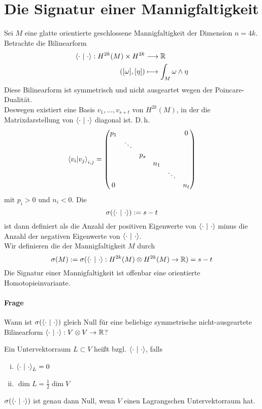 \section{Die Signatur einer Mannigfaltigkeit}
Sei $M$ eine glatte orientierte geschlossene Mannigfaltigkeit der Dimension $n = 4k$.\\
Betrachte die Bilinearform
\begin{align*}
\left<\cdot ~|~\cdot\right>: H^{2k}(M) \times H^{2k} & \overset{}{\longrightarrow} \mathbb{R}\\
([\omega], [\eta]) &\longmapsto \int_M \omega \wedge \eta
\end{align*}
Diese Bilinearform ist symmetrisch und nicht ausgeartet wegen der Poincare-Dualität.\\
Deswegen existiert eine Basis $v_1, \ldots, v_{s+t}$ von $H^{2k}(M)$, in der die Matrixdarstellung von $\left<\cdot~|~\cdot\right>$ diagonal ist. D.\,h.
\[ \left<v_i|v_j\right>_{i,j} = \left(
\begin{matrix}
	p_1 &        &     &     &        &  0   \\
	    & \ddots &     &     &        &  \\
	    &        & p_s &     &        &     \\
	    &        &     & n_1 &        &     \\
	    &        &     &     & \ddots &     \\
	0    &        &     &     &        & n_t
\end{matrix}
\right) \]
mit $p_i >0$ und $n_i< 0$. Die  
\[\sigma(\left<\cdot~|~\cdot\right>):= s-t\]
ist dann definiert als die Anzahl der positiven Eigenwerte von $\left<\cdot~|~\cdot\right>$ minus die Anzahl der negativen Eigenwerte von $\left<\cdot~|~\cdot\right>$.\\
Wir definieren die  der Mannigfaltigkeit $M$ durch
\[ \sigma(M):= \sigma(\left<\cdot~|~\cdot\right> : H^{2k}(M) \otimes H^{2k}(M) \overset{}{\rightarrow} \mathbb{R})= s-t\]
Die Signatur einer Mannigfaltigkeit ist offenbar eine orientierte Homotopieinvariante.

\paragraph{Frage}
Wann ist $\sigma(\left<\cdot ~|~\cdot\right>)$ gleich Null für eine beliebige symmetrische nicht-ausgeartete Bilinearform $\left<\cdot~|~\cdot\right> : V\otimes V \overset{}{\rightarrow} \mathbb{R}$?

\Def{}
Ein Untervektorraum $L\subset V$ heißt  bzgl. $\left<\cdot ~|~\cdot\right>$, falls
\begin{enumerate}[i.)]
	\item $\left<\cdot ~|~\cdot\right>_{L} = 0$
	\item $\dim L = \frac{1}{2} \dim V$
\end{enumerate}

\Satz{}
$\sigma(\left<\cdot ~|~\cdot\right>)$ ist genau dann Null, wenn $V$ einen Lagrangschen Untervektorraum hat.
